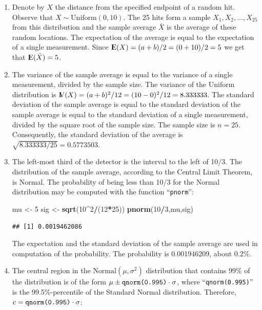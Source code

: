 \documentclass[]{krantz}
\makeatletter
\newenvironment{Shaded}{\begin{snugshade}}{\end{snugshade}}
\newcommand{\DecValTok}[1]{\textcolor[rgb]{0.00,0.00,0.81}{#1}}
\newcommand{\KeywordTok}[1]{\textcolor[rgb]{0.13,0.29,0.53}{\textbf{#1}}}
\newcommand{\NormalTok}[1]{#1}
\newcommand{\OperatorTok}[1]{\textcolor[rgb]{0.81,0.36,0.00}{\textbf{#1}}}
\newcommand{\StringTok}[1]{\textcolor[rgb]{0.31,0.60,0.02}{#1}}
\newcommand{\Expec}{{\rm I\kern-.3em E}}
\newcommand{\Var}{{\rm I\kern-.3em V}}
\newenvironment{kframe}{%
\medskip{}
\setlength{\fboxsep}{.8em}
 \def\at@end@of@kframe{}%
 \ifinner\ifhmode%
  \def\at@end@of@kframe{\end{minipage}}%
  \begin{minipage}{\columnwidth}%
 \fi\fi%
 \def\FrameCommand##1{\hskip\@totalleftmargin \hskip-\fboxsep
 \colorbox{shadecolor}{##1}\hskip-\fboxsep
     \hskip-\linewidth \hskip-\@totalleftmargin \hskip\columnwidth}%
 \MakeFramed {\advance\hsize-\width
   \@totalleftmargin\z@ \linewidth\hsize
   \@setminipage}}%
 {\par\unskip\endMakeFramed%
 \at@end@of@kframe}
\renewenvironment{Shaded}{\begin{kframe}}{\end{kframe}}
\theoremstyle{definition}
\theoremstyle{definition}
\theoremstyle{definition}
\theoremstyle{remark}
\makeatother
\begin{document}
\begin{enumerate}
\def\labelenumi{\arabic{enumi}.}
\item
  Denote by \(X\) the distance from the
  specified endpoint of a random hit. Observe that
  \(X \sim \mbox{Uniform}(0,10)\). The 25 hits form a sample
  \(X_1, X_2, \ldots, X_{25}\) from this distribution and the sample average
  \(\bar X\) is the average of these random locations. The expectation of
  the average is equal to the expectation of a single measurement. Since
  \(\Expec(X) = (a + b)/2 = (0 + 10)/2 = 5\) we get that
  \(\Expec(\bar X) = 5\).
\item
  The variance of the sample average
  is equal to the variance of a single measurement, divided by the sample
  size. The variance of the Uniform distribution is
  \(\Var(X) = (a + b)^2/12 = (10-0)^2/12 = 8.333333\). The standard
  deviation of the sample average is equal to the standard deviation of
  the sample average is equal to the standard deviation of a single
  measurement, divided by the square root of the sample size. The sample
  size is \(n=25\). Consequently, the standard deviation of the average is
  \(\sqrt{8.333333/25}=0.5773503\).
\item
  The left-most third of the detector
  is the interval to the left of 10/3. The distribution of the sample
  average, according to the Central Limit Theorem, is Normal. The
  probability of being less than 10/3 for the Normal distribution may be
  computed with the function ``\texttt{pnorm}'':

\begin{Shaded}
\begin{Highlighting}[]
\NormalTok{mu <-}\StringTok{ }\DecValTok{5}
\NormalTok{sig <-}\StringTok{ }\KeywordTok{sqrt}\NormalTok{(}\DecValTok{10}\OperatorTok{^}\DecValTok{2}\OperatorTok{/}\NormalTok{(}\DecValTok{12}\OperatorTok{*}\DecValTok{25}\NormalTok{))}
\KeywordTok{pnorm}\NormalTok{(}\DecValTok{10}\OperatorTok{/}\DecValTok{3}\NormalTok{,mu,sig)}
\end{Highlighting}
\end{Shaded}

\begin{verbatim}
## [1] 0.0019462086
\end{verbatim}

  The expectation and the standard deviation of the sample average are
  used in computation of the probability. The probability is 0.001946209,
  about 0.2\%.
\item
  The central region in the
  \(\mbox{Normal}(\mu,\sigma^2)\) distribution that contains 99\% of the
  distribution is of the form
  \(\mu \pm \mbox{\texttt{qnorm(0.995)}}\cdot \sigma\), where
  ``\texttt{qnorm(0.995)}'' is the 99.5\%-percentile of the Standard Normal
  distribution. Therefore, \(c =\mbox{\texttt{qnorm(0.995)}}\cdot \sigma\):


\end{enumerate}
\end{document}
